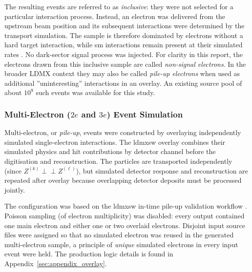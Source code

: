 The resulting events are referred to as \emph{inclusive}: they were not
selected for a particular interaction process. Instead, an electron was
delivered from the upstream beam position and its subsequent
interactions were determined by the transport simulation. The sample is
therefore dominated by electrons without a hard target interaction, while
\gls{sm} interactions remain present at their simulated rates
\cite{ldmx2025-overview}. No dark-sector signal process was injected. For clarity in this
report, the electrons drawn from this inclusive sample are called
\emph{non-signal electrons}. In the broader LDMX context they may also be
called \emph{pile-up electrons} when used as additional ''uninteresting'' interactions in an overlay. An existing source pool of about \(10^9\) such events was available for this study. 

\subsubsection{Multi-Electron (\(2e\) and \(3e\)) Event Simulation}
\label{sec:2e_sim}

Multi-electron, or \emph{pile-up}, events were constructed by overlaying
independently simulated single-electron interactions. The \gls{ldmxsw}
overlay combines their simulated physics and hit contributions by detector channel before the digitisation and reconstruction. The particles are transported independently (since $Z^{(k)} \perp\!\!\!\perp Z^{(\ell)}$),
but simulated detector response and reconstruction are repeated after overlay because
overlapping detector deposits must be processed jointly.

The configuration was based on the \gls{ldmxsw} in-time pile-up validation
workflow \cite{ldmx-github-itpileup}. Poisson sampling (of electron multiplicity) was disabled: every
output contained one main electron and either one or two overlaid electrons. Disjoint input source files were assigned so that no simulated electron was reused in the generated multi-electron sample, a principle of \textit{unique} simulated electrons in every input event were held. The production logic details is found in Appendix~\ref{sec:appendix_overlay}.

